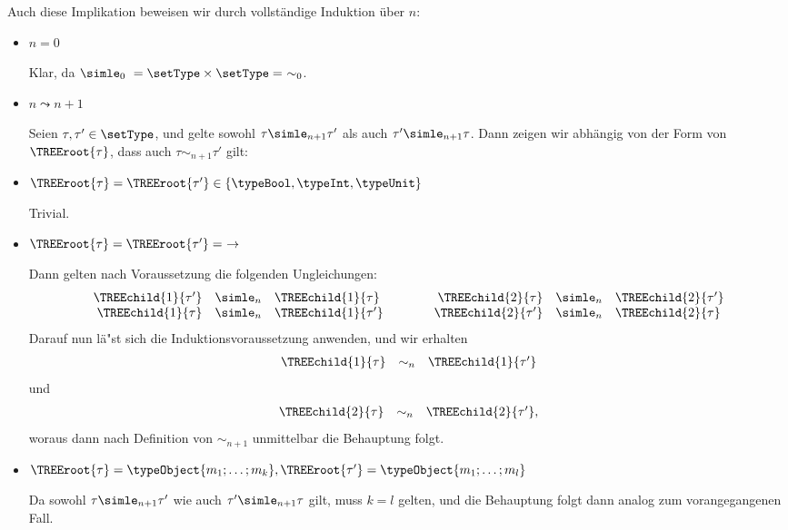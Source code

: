 \begin{beweis}
\begin{enumerate}
          Auch diese Implikation beweisen wir durch vollst\"andige Induktion \"uber $n$:
          \begin{itemize}
            \item $n=0$

                  Klar, da $\simle_0\ = \setType\times\setType =\ \sim_0$.

            \item $n\leadsto{n+1}$

                  Seien $\tau,\tau'\in\setType$, und gelte sowohl $\tau \simle_{n+1} \tau'$ als auch
                  $\tau' \simle_{n+1} \tau$. Dann zeigen wir abh\"angig von der Form von $\TREEroot{\tau}$,
                  dass auch $\tau \sim_{n+1} \tau'$ gilt:
                  \PROOFCASEbeg
                    \item $\TREEroot{\tau} = \TREEroot{\tau'} \in \{\typeBool,\typeInt,\typeUnit\}$

                          Trivial.

                    \item $\TREEroot{\tau} = \TREEroot{\tau'} =\ \to$

                          Dann gelten nach Voraussetzung die folgenden Ungleichungen:
                          \[\begin{array}{rclcrcl}
                            \TREEchild{1}{\tau'} & \simle_n & \TREEchild{1}{\tau}
                            & \quad \quad &
                            \TREEchild{2}{\tau} & \simle_n & \TREEchild{2}{\tau'} \\
                            \TREEchild{1}{\tau} & \simle_n & \TREEchild{1}{\tau'}
                            & \quad \quad &
                            \TREEchild{2}{\tau'} & \simle_n & \TREEchild{2}{\tau}
                          \end{array}\]
                          Darauf nun l\"a"st sich die Induktionsvoraussetzung anwenden, und wir erhalten
                          \[\begin{array}{rcl}
                            \TREEchild{1}{\tau} & \sim_n & \TREEchild{1}{\tau'}
                          \end{array}\]
                          und
                          \[\begin{array}{rcl}
                            \TREEchild{2}{\tau} & \sim_n & \TREEchild{2}{\tau'},
                          \end{array}\]
                          woraus dann nach Definition von $\sim_{n+1}$ unmittelbar die Behauptung folgt.

                    \item $\TREEroot{\tau} = \typeObject{m_1;\ldots;m_k}, \TREEroot{\tau'} = \typeObject{m_1;\ldots;m_l}$

                          Da sowohl $\tau \simle_{n+1} \tau'$ wie auch $\tau' \simle_{n+1} \tau$ gilt, muss $k=l$
                          gelten, und die Behauptung folgt dann analog zum vorangegangenen Fall.
                  \PROOFCASEend
          \end{itemize}
  \end{enumerate}
\end{beweis}
